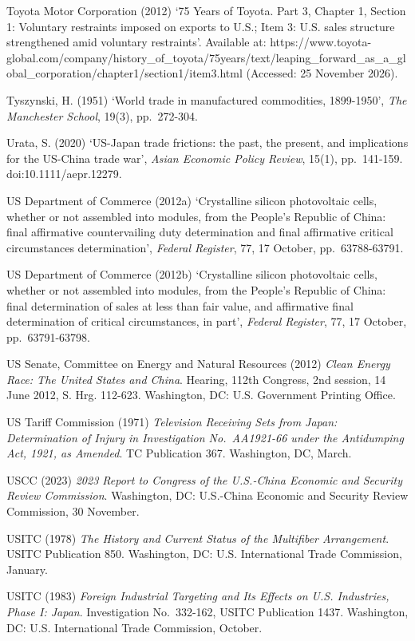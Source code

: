 Toyota Motor Corporation (2012) `75 Years of Toyota. Part 3, Chapter 1,
Section 1: Voluntary restraints imposed on exports to U.S.; Item 3: U.S.
sales structure strengthened amid voluntary restraints'. Available at:
https://www.toyota-global.com/company/history\_of\_toyota/75years/text/leaping\_forward\_as\_a\_global\_corporation/chapter1/section1/item3.html
(Accessed: 25 November 2026).

Tyszynski, H. (1951) `World trade in manufactured commodities,
1899-1950', \emph{The Manchester School}, 19(3), pp.~272-304.

Urata, S. (2020) `US-Japan trade frictions: the past, the present, and
implications for the US-China trade war', \emph{Asian Economic Policy
Review}, 15(1), pp.~141-159. doi:10.1111/aepr.12279.

US Department of Commerce (2012a) `Crystalline silicon photovoltaic
cells, whether or not assembled into modules, from the People's Republic
of China: final affirmative countervailing duty determination and final
affirmative critical circumstances determination', \emph{Federal
Register}, 77, 17 October, pp.~63788-63791.

US Department of Commerce (2012b) `Crystalline silicon photovoltaic
cells, whether or not assembled into modules, from the People's Republic
of China: final determination of sales at less than fair value, and
affirmative final determination of critical circumstances, in part',
\emph{Federal Register}, 77, 17 October, pp.~63791-63798.

US Senate, Committee on Energy and Natural Resources (2012) \emph{Clean
Energy Race: The United States and China}. Hearing, 112th Congress, 2nd
session, 14 June 2012, S. Hrg. 112-623. Washington, DC: U.S. Government
Printing Office.

US Tariff Commission (1971) \emph{Television Receiving Sets from Japan:
Determination of Injury in Investigation No.~AA1921-66 under the
Antidumping Act, 1921, as Amended}. TC Publication 367. Washington, DC,
March.

USCC (2023) \emph{2023 Report to Congress of the U.S.-China Economic and
Security Review Commission}. Washington, DC: U.S.-China Economic and
Security Review Commission, 30 November.

USITC (1978) \emph{The History and Current Status of the Multifiber
Arrangement}. USITC Publication 850. Washington, DC: U.S. International
Trade Commission, January.

USITC (1983) \emph{Foreign Industrial Targeting and Its Effects on U.S.
Industries, Phase I: Japan}. Investigation No.~332-162, USITC
Publication 1437. Washington, DC: U.S. International Trade Commission,
October.

